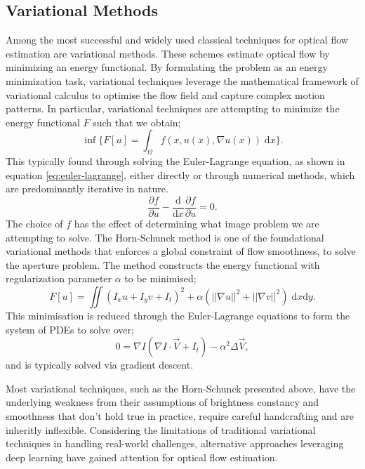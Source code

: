 \subsection{Variational Methods}

\IEEEPARstart{}{} Among the most successful and widely used classical techniques for optical flow estimation are variational methods. These schemes estimate optical flow by minimizing an energy functional. By formulating the problem as an energy minimization task, variational techniques leverage the mathematical framework of variational calculus to optimise the flow field and capture complex motion patterns. In particular, variational techniques are attempting to minimize the energy functional $F$ such that we obtain;
\begin{equation}
	\inf \Bigg\{ F[u] = \int_{\Omega} f(x, u(x), \nabla u(x)) \; \mathrm{d}x\Bigg\}.
\end{equation}
This typically found through solving the Euler-Lagrange equation, as shown in equation \ref{eq:euler-lagrange}, either directly or through numerical methods, which are predominantly iterative in nature. 
\begin{equation} \label{eq:euler-lagrange}
	\frac{\partial f}{\partial u} - \frac{\mathrm{d}}{\mathrm{d}x} \frac{\partial f}{\partial \dot{u}} = 0.
\end{equation}
The choice of $f$ has the effect of determining what image problem we are attempting to solve. The Horn-Schunck method is one of the foundational variational methods that enforces a global constraint of flow smoothness, to solve the aperture problem. The method constructs the energy functional with regularization parameter $\alpha$ to be minimised;
\begin{equation*}
	F[u] = \iint ( I_x u + I_y v + I_t)^2 + \alpha (||\nabla u||^2 + ||\nabla v||^2) \; \mathrm{d}x \mathrm{d}y.
\end{equation*}
This minimisation is reduced through the Euler-Lagrange equations to form the system of PDEs to solve over;
\begin{equation}
		0 = \nabla I (\nabla I \cdot \vec{V} + I_t ) - \alpha^2 \Delta \vec{V},
\end{equation}
and is typically solved via gradient descent.

\IEEEPARstart{} Most variational techniques, such as the Horn-Schunck presented above, have the underlying weakness from their assumptions of brightness constancy and smoothness that don't hold true in practice, require careful handcrafting and are inheritly inflexible. Considering the limitations of traditional variational techniques in handling real-world challenges, alternative approaches leveraging deep learning have gained attention for optical flow estimation.

